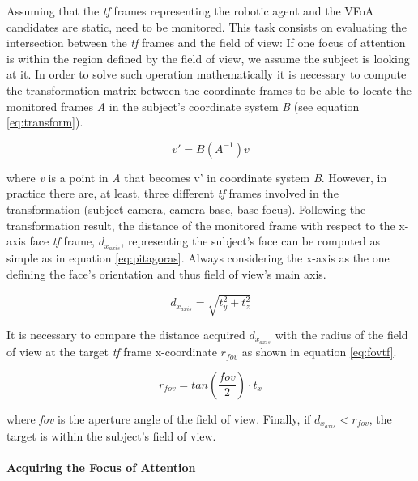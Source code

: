 \documentclass{sig-alternate}
\begin{document}
Assuming that the \textit{tf} frames representing the robotic agent and the VFoA
candidates are static, need to be monitored. This task consists on evaluating
the intersection between the \textit{tf} frames and the field of view: If one
focus of attention is within the region defined by the field of view, we assume
the subject is looking at it. In order to solve such operation mathematically it
is necessary to compute the transformation matrix between the coordinate frames
to be able to locate the monitored frames \textit{A} in the subject's coordinate
system \textit{B} (see equation \ref{eq:transform}).

\begin{equation}
v' = B(A^{-1})v
\label{eq:transform}
\end{equation}

where \textit{v} is a point in \textit{A} that becomes v' in coordinate system
\textit{B}. However, in practice there are, at least, three different
\textit{tf} frames involved in the transformation (subject-camera, camera-base,
base-focus). Following the transformation result, the distance of the monitored
frame with respect to the x-axis face \textit{tf} frame, $ d_{x_{axis}} $,
representing the subject's face can be computed as simple as in equation
\ref{eq:pitagoras}. Always considering the x-axis as the one defining the face's
orientation and thus field of view's main axis.

\begin{equation}
d_{x_{axis}} = \sqrt{t_y^2 + t_z^2}
\label{eq:pitagoras}
\end{equation}

It is necessary to compare the distance acquired $ d_{x_{axis}} $ with the
radius of the field of view at the target \textit{tf} frame x-coordinate $
r_{fov} $ as shown in equation \ref{eq:fovtf}.

\begin{equation}
r_{fov} = tan\left(\frac{fov}{2}\right) \cdot t_x
\label{eq:fovtf}
\end{equation}

where \textit{fov} is the aperture angle of the field of view. Finally, if $
d_{x_{axis}}<r_{fov} $, the target is within the subject's field of view.


\paragraph{Acquiring the Focus of Attention}
\end{document}
